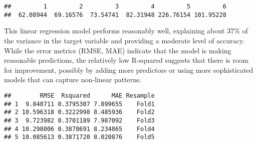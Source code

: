 \documentclass[
]{article}
\newenvironment{Shaded}{\begin{snugshade}}{\end{snugshade}}
\newcommand{\CommentTok}[1]{\textcolor[rgb]{0.56,0.35,0.01}{\textit{#1}}}
\newcommand{\NormalTok}[1]{#1}
\newcommand{\SpecialCharTok}[1]{\textcolor[rgb]{0.81,0.36,0.00}{\textbf{#1}}}
\begin{document}
\begin{verbatim}
##         1         2         3         4         5         6 
##  62.08944  69.16576  73.54741  82.31948 226.76154 101.95228
\end{verbatim}

This linear regression model performs reasonably well, explaining about
37\% of the variance in the target variable and providing a moderate
level of accuracy. While the error metrics (RMSE, MAE) indicate that the
model is making reasonable predictions, the relatively low R-squared
suggests that there is room for improvement, possibly by adding more
predictors or using more sophisticated models that can capture
non-linear patterns.

\begin{Shaded}
\end{Shaded}

\begin{verbatim}
##        RMSE  Rsquared      MAE Resample
## 1  9.840711 0.3795307 7.899655    Fold1
## 2 10.596318 0.3222998 8.485936    Fold2
## 3  9.723982 0.3701189 7.987092    Fold3
## 4 10.298006 0.3870691 8.234865    Fold4
## 5 10.085613 0.3871720 8.020876    Fold5
\end{verbatim}
\end{document}
